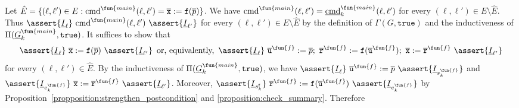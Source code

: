 Let $\hat{E} = \{ (\ell, \ell') \in E : \textmd{cmd}^\fun{main} (\ell, \ell') =
\overline{\mathtt{x}} := \mathtt{f} (\overline{p}) \}$. We have
$\textmd{cmd}^\fun{main} (\ell, \ell') = \underline{\textmd{cmd}}_k^\fun{main} (\ell, \ell')$ for every
$(\ell, \ell') \in E \setminus \hat{E}$. Thus $\assert{\underline{I}_{\ell}}\
\textmd{cmd}^\fun{main} (\ell, \ell')\ \assert{\underline{I}_{\ell'}}$ for every $(\ell,
\ell') \in E \setminus \hat{E}$ by the definition of $\Gamma (G,
\mathtt{true})$ and the inductiveness of $\Pi (\underline{G}^{\fun{main}}_k,
\mathtt{true})$. It suffices to show that
\begin{equation*}
  \assert{\underline{I}_{\ell}}\
  \overline{\mathtt{x}} := \mathtt{f} (\overline{p})
  \ \assert{\underline{I}_{\ell'}}
  \hspace{0.5em}
  \textmd{or, equivalently,}
  \hspace{0.5em}
  \assert{\underline{I}_{\ell}}\ 
  \overline{\mathtt{u}}^\fun{f} := \overline{p};\ 
  \mathtt{\overline{r}}^\fun{f} := \mathtt{f} (\overline{\mathtt{u}}^\fun{f});\ 
  \overline{\mathtt{x}} := \mathtt{\overline{r}}^\fun{f}
  \ \assert{\underline{I}_{\ell'}}
\end{equation*}
for every $(\ell, \ell') \in \hat{E}$. 
By the inductiveness of $\Pi (\underline{G}^{\fun{main}}_k, \mathtt{true})$, we have
$\assert{\underline{I}_{\ell}}\ \overline{\mathtt{u}}^\fun{f} := \overline{p}\
\assert{\underline{I}_{s_k^\fun{f}}}$ and
$\assert{\underline{I}_{e_k^\fun{f}}}\ \overline{\mathtt{x}} :=
\mathtt{\overline{r}}^\fun{f}\ \assert{\underline{I}_{\ell'}}$. 
Moreover,
$\assert{\underline{I}_{s_k^\mathtt{f}}}\
\mathtt{\overline{r}}^\fun{f} := \mathtt{f}
(\overline{\mathtt{u}}^\fun{f})\ \assert{\underline{I}_{e_k^\fun{f}}}$ 
by Proposition~\ref{propposition:strengthen_postcondition} and \ref{proposition:check_summary}.
Therefore
\begin{prooftree}



\end{prooftree}